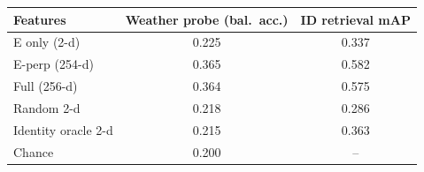 \begin{tabular}{lcc}
\toprule
Features & Weather probe (bal.\ acc.) & ID retrieval mAP \\
\midrule
E only (2-d) & 0.225 & 0.337 \\
E-perp (254-d) & 0.365 & 0.582 \\
Full (256-d) & 0.364 & 0.575 \\
Random 2-d & 0.218 & 0.286 \\
Identity oracle 2-d & 0.215 & 0.363 \\
\midrule
Chance & 0.200 & -- \\
\bottomrule
\end{tabular}
